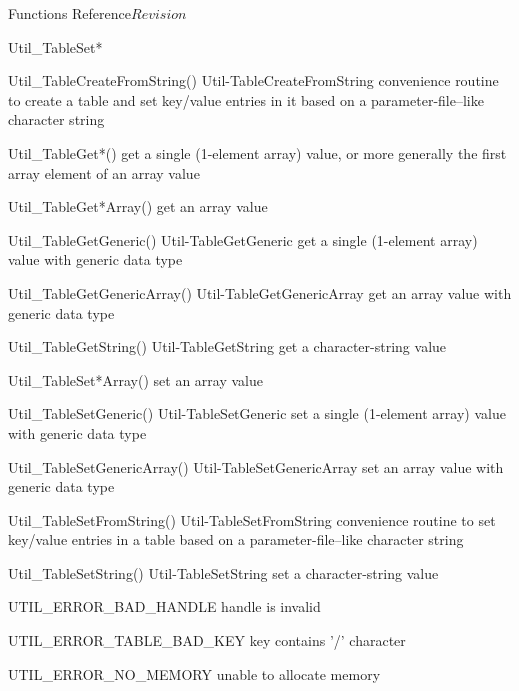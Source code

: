 \begin{cactuspart}{ Functions Reference}{}{$Revision$}
\begin{FunctionDescription}{Util\_TableSet*}
\begin{SeeAlsoSection}
\begin{SeeAlso2} {Util\_TableCreateFromString()} {Util-TableCreateFromString}
convenience routine to create a table and set key/value entries
in it based on a parameter-file--like character string
\end{SeeAlso2}
\begin{SeeAlso}{Util\_TableGet*()}
get a single (1-element array) value,
or more generally the first array element of an array value
\end{SeeAlso}
\begin{SeeAlso}{Util\_TableGet*Array()}
get an array value
\end{SeeAlso}
\begin{SeeAlso2} {Util\_TableGetGeneric()} {Util-TableGetGeneric}
get a single (1-element array) value with generic data type
\end{SeeAlso2}
\begin{SeeAlso2} {Util\_TableGetGenericArray()} {Util-TableGetGenericArray}
get an array value with generic data type
\end{SeeAlso2}
\begin{SeeAlso2} {Util\_TableGetString()} {Util-TableGetString}
get a character-string value
\end{SeeAlso2}
\begin{SeeAlso}{Util\_TableSet*Array()}
set an array value
\end{SeeAlso}
\begin{SeeAlso2} {Util\_TableSetGeneric()} {Util-TableSetGeneric}
set a single (1-element array) value with generic data type
\end{SeeAlso2}
\begin{SeeAlso2} {Util\_TableSetGenericArray()} {Util-TableSetGenericArray}
set an array value with generic data type
\end{SeeAlso2}
\begin{SeeAlso2} {Util\_TableSetFromString()} {Util-TableSetFromString}
convenience routine to set key/value entries in a table based on a
parameter-file--like character string
\end{SeeAlso2}
\begin{SeeAlso2} {Util\_TableSetString()} {Util-TableSetString}
set a character-string value
\end{SeeAlso2}
\end{SeeAlsoSection}

\begin{ErrorSection}
\begin{Error}{UTIL\_ERROR\_BAD\_HANDLE}
handle is invalid
\end{Error}
\begin{Error}{UTIL\_ERROR\_TABLE\_BAD\_KEY}
key contains '/' character
\end{Error}
\begin{Error}{UTIL\_ERROR\_NO\_MEMORY}
unable to allocate memory
\end{Error}
\end{ErrorSection}


\end{FunctionDescription}
\end{cactuspart}

